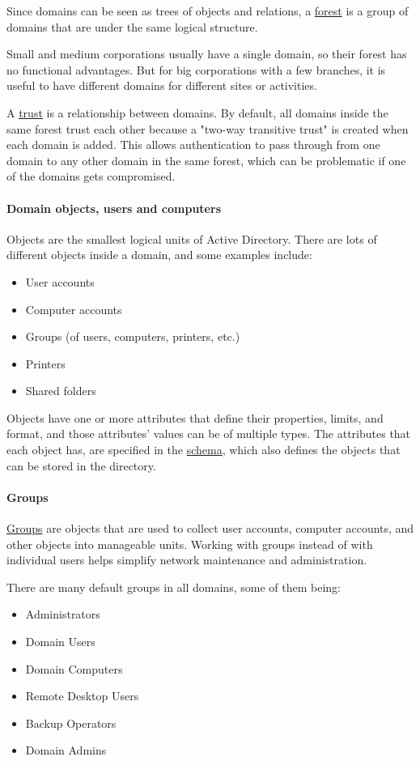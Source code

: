 Since domains can be seen as trees of objects and relations, a \underline{forest} is a group of domains that are under the same logical structure.

Small and medium corporations usually have a single domain, so their forest has no functional advantages. But for big corporations with a few branches, it is useful to have different domains for different sites or activities.

A \underline{trust} is a relationship between domains. By default, all domains inside the same forest trust each other because a "two-way transitive trust" is created when each domain is added. This allows authentication to pass through from one domain to any other domain in the same forest, which can be problematic if one of the domains gets compromised. 

\paragraph{Domain objects, users and computers}

Objects are the smallest logical units of Active Directory. There are lots of different objects inside a domain, and some examples include:
\begin{itemize}
\item User accounts
\item Computer accounts
\item Groups (of users, computers, printers, etc.)
\item Printers
\item Shared folders
\end{itemize}

Objects have one or more attributes that define their properties, limits, and format, and those attributes' values can be of multiple types. The attributes that each object has, are specified in the \underline{schema}, which also defines the objects that can be stored in the directory.

\paragraph{Groups}

\underline{Groups} are objects that are used to collect user accounts, computer accounts, and other objects into manageable units. Working with groups instead of with individual users helps simplify network maintenance and administration.

There are many default groups in all domains, some of them being:
\begin{itemize}
\item Administrators
\item Domain Users
\item Domain Computers
\item Remote Desktop Users
\item Backup Operators
\item Domain Admins
\end{itemize}

